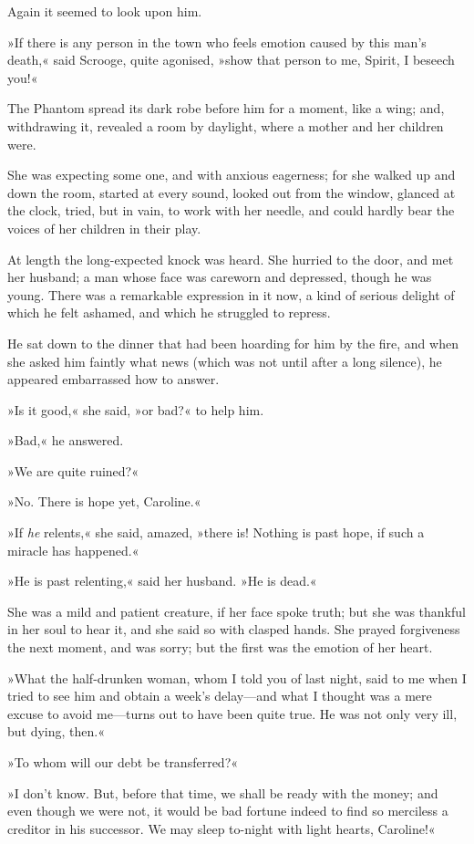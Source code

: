 Again it seemed to look upon him.

»If there is any person in the town who feels emotion caused by this man's death,« said Scrooge, quite agonised, »show that person to me, Spirit, I beseech you!«

The Phantom spread its dark robe before him for a moment, like a wing; and, withdrawing it, revealed a room by daylight, where a mother and her children were.

She was expecting some one, and with anxious eagerness; for she walked up and down the room, started at every sound, looked out from the window, glanced at the clock, tried, but in vain, to work with her needle, and could hardly bear the voices of her children in their play.

At length the long-expected knock was heard. She hurried to the door, and met her husband; a man whose face was careworn and depressed, though he was young. There was a remarkable expression in it now, a kind of serious delight of which he felt ashamed, and which he struggled to repress.

He sat down to the dinner that had been hoarding for him by the fire, and when she asked him faintly what news (which was not until after a long silence), he appeared embarrassed how to answer.

»Is it good,« she said, »or bad?« to help him.

»Bad,« he answered.

»We are quite ruined?«

»No. There is hope yet, Caroline.«

»If \textit{he} relents,« she said, amazed, »there is! Nothing is past hope, if such a miracle has happened.«

»He is past relenting,« said her husband. »He is dead.«

She was a mild and patient creature, if her face spoke truth; but she was thankful in her soul to hear it, and she said so with clasped hands. She prayed forgiveness the next moment, and was sorry; but the first was the emotion of her heart.

»What the half-drunken woman, whom I told you of last night, said to me when I tried to see him and obtain a week's delay---and what I thought was a mere excuse to avoid me---turns out to have been quite true. He was not only very ill, but dying, then.«

»To whom will our debt be transferred?«

»I don't know. But, before that time, we shall be ready with the money; and even though we were not, it would be bad fortune indeed to find so merciless a creditor in his successor. We may sleep to-night with light hearts, Caroline!«

